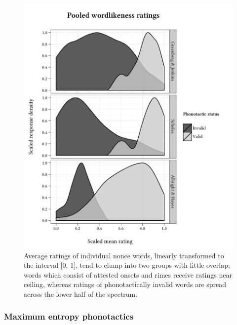 \begin{figure} \centering
\includegraphics{density.pdf}
\caption{Average ratings of individual nonce words, linearly transformed to the interval [0, 1], tend to clump into two groups with little overlap; words which consist of  attested onsets and rimes receive ratings near ceiling, whereas ratings of phonotactically invalid words are spread across the lower half of the spectrum.}
\label{dsn}
\end{figure}

\subsubsection{Maximum entropy phonotactics}

